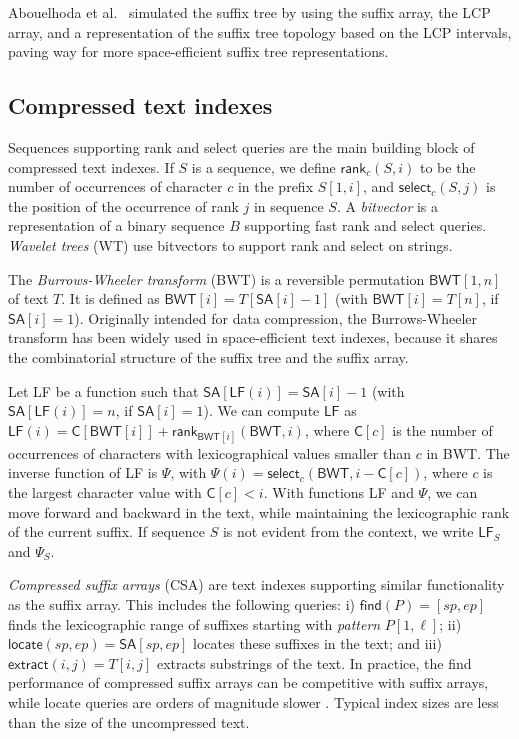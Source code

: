 \documentclass[a4paper,11pt]{llncs}
\newcommand{\SA}{\textsf{SA}}
\newcommand{\BWT}{\textsf{BWT}}
\newcommand{\CSA}{\textsf{CSA}}
\newcommand{\mSA}{\ensuremath{\mathsf{SA}}}
\newcommand{\mBWT}{\ensuremath{\mathsf{BWT}}}
\newcommand{\LCP}{\textsf{LCP}}
\newcommand{\WT}{\textsf{WT}}
\newcommand{\mC}{\ensuremath{\mathsf{C}}}
\newcommand{\LF}{\textsf{LF}}
\newcommand{\find}{\textsf{find}}
\newcommand{\locate}{\textsf{locate}}
\newcommand{\rank}{\textsf{rank}}
\newcommand{\select}{\textsf{select}}
\newcommand{\mLF}{\ensuremath{\mathsf{LF}}}
\newcommand{\mPsi}{\ensuremath{\mathsf{\Psi}}}
\newcommand{\mfind}{\ensuremath{\mathsf{find}}}
\newcommand{\mlocate}{\ensuremath{\mathsf{locate}}}
\newcommand{\mextract}{\ensuremath{\mathsf{extract}}}
\newcommand{\mrank}{\ensuremath{\mathsf{rank}}}
\newcommand{\mselect}{\ensuremath{\mathsf{select}}}
\begin{document}
Abouelhoda et al.~\cite{Abouelhoda2004} simulated the suffix tree by using the suffix array, the \LCP{} array, and a representation of the suffix tree topology based on the \LCP{} intervals, paving way for more space-efficient suffix tree representations.

\subsection{Compressed text indexes}

Sequences supporting \rank{} and \select{} queries are the main building block of compressed text indexes. If $S$ is a sequence, we define $\mrank_{c}(S,i)$ to be the number of occurrences of character $c$ in the prefix $S[1,i]$, and $\mselect_{c}(S,j)$ is the position of the occurrence of rank $j$ in sequence $S$. A \emph{bitvector} is a representation of a binary sequence $B$ supporting fast \rank{} and \select{} queries. \emph{Wavelet trees} (\WT) \cite{Grossi2003} use bitvectors to support \rank{} and \select{} on strings.

The \emph{Burrows-Wheeler transform} (\BWT) \cite{Burrows1994} is a reversible permutation $\mBWT[1,n]$ of text $T$. It is defined as $\mBWT[i] = T[\mSA[i] - 1]$ (with $\mBWT[i] = T[n]$, if $\SA[i] = 1$). Originally intended for data compression, the Burrows-Wheeler transform has been widely used in space-efficient text indexes, because it shares the combinatorial structure of the suffix tree and the suffix array.

Let \LF{} be a function such that $\mSA[\mLF(i)] = \mSA[i] - 1$ (with $\mSA[\mLF(i)] = n$, if $\mSA[i] = 1$). We can compute $\mLF$ as $\mLF(i) = \mC[\mBWT[i]] + \mrank_{\mBWT[i]}(\mBWT, i)$, where $\mC[c]$ is the number of occurrences of characters with lexicographical values smaller than $c$ in \BWT. The inverse function of \LF{} is $\mPsi$, with $\mPsi(i) = \mselect_{c}(\mBWT, i - \mC[c])$, where $c$ is the largest character value with $\mC[c] < i$. With functions \LF{} and $\mPsi$, we can move forward and backward in the text, while maintaining the lexicographic rank of the current suffix. If sequence $S$ is not evident from the context, we write $\mLF_{S}$ and $\mPsi_{S}$.

\emph{Compressed suffix arrays} (\CSA) \cite{Ferragina2005a,Grossi2005} are text indexes supporting similar functionality as the suffix array. This includes the following queries: i) $\mfind(P) = [sp,ep]$ finds the lexicographic range of suffixes starting with \emph{pattern} $P[1,\ell]$; ii) $\mlocate(sp,ep) = \mSA[sp,ep]$ locates these suffixes in the text; and iii) $\mextract(i,j) = T[i,j]$ extracts substrings of the text. In practice, the \find{} performance of compressed suffix arrays can be competitive with suffix arrays, while \locate{} queries are orders of magnitude slower \cite{Ferragina2009a}. Typical index sizes are less than the size of the uncompressed text.
\end{document}
